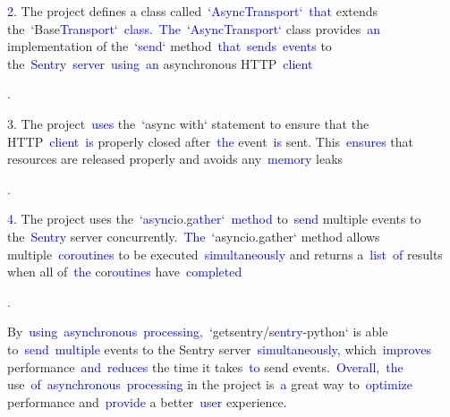 \documentclass{article}
\begin{document}
\begin{tcolorbox}[colframe=black,colback=white]
{}\textcolor{blue}{2}. The project defines a class called\textcolor{blue}{~`}\textcolor{blue}{Async}\textcolor{blue}{Transport}\textcolor{blue}{`}\textcolor{blue}{~that} extends the\textcolor{blue}{~`}Base\textcolor{blue}{Transport}\textcolor{blue}{`}\textcolor{blue}{~class}\textcolor{blue}{.}\textcolor{blue}{~The}\textcolor{blue}{~`}\textcolor{blue}{Async}\textcolor{blue}{Transport}\textcolor{blue}{`} class provides\textcolor{blue}{~an} implementation of the\textcolor{blue}{~`}\textcolor{blue}{send}\textcolor{blue}{`} method\textcolor{blue}{~that}\textcolor{blue}{~sends}\textcolor{blue}{~events} to the\textcolor{blue}{~Sentry}\textcolor{blue}{~server}\textcolor{blue}{~using}\textcolor{blue}{~an} asynchronous HTTP\textcolor{blue}{~client}\textcolor{blue}{.

}3. The project\textcolor{blue}{~uses} the\textcolor{blue}{~`}async with\textcolor{blue}{`} statement to ensure that the HTTP\textcolor{blue}{~client}\textcolor{blue}{~is} properly closed after\textcolor{blue}{~the} event\textcolor{blue}{~is} sent. This\textcolor{blue}{~ensures} that resources are released properly and avoids any\textcolor{blue}{~memory} leaks\textcolor{blue}{.

}\textcolor{blue}{4}. The project uses the\textcolor{blue}{~`}\textcolor{blue}{async}io.g\textcolor{blue}{ather}\textcolor{blue}{`}\textcolor{blue}{~method} to\textcolor{blue}{~send} multiple events to the\textcolor{blue}{~Sentry} server concurrently.\textcolor{blue}{~The}\textcolor{blue}{~`}asyncio.gather` method allows multiple\textcolor{blue}{~cor}\textcolor{blue}{outines} to be executed\textcolor{blue}{~simultaneously} and returns a\textcolor{blue}{~list}\textcolor{blue}{~of} results when all of\textcolor{blue}{~the} cor\textcolor{blue}{outines} have\textcolor{blue}{~completed}\textcolor{blue}{.

}By\textcolor{blue}{~using}\textcolor{blue}{~asynchronous}\textcolor{blue}{~processing}\textcolor{blue}{,}\textcolor{blue}{~`}getsentry/s\textcolor{blue}{entry}-python` is able to\textcolor{blue}{~send}\textcolor{blue}{~multiple} events to the Sentry server\textcolor{blue}{~simultaneously}\textcolor{blue}{,} which\textcolor{blue}{~improves} performance\textcolor{blue}{~and}\textcolor{blue}{~reduces} the time it takes\textcolor{blue}{~to} send events.\textcolor{blue}{~Overall}\textcolor{blue}{,}\textcolor{blue}{~the} use\textcolor{blue}{~of}\textcolor{blue}{~asynchronous}\textcolor{blue}{~processing} in the project is\textcolor{blue}{~a} great way to\textcolor{blue}{~optimize} performance and\textcolor{blue}{~provide} a better\textcolor{blue}{~user} experience\textcolor{blue}{.}\textcolor{blue}{}
\end{tcolorbox}
\end{document}
